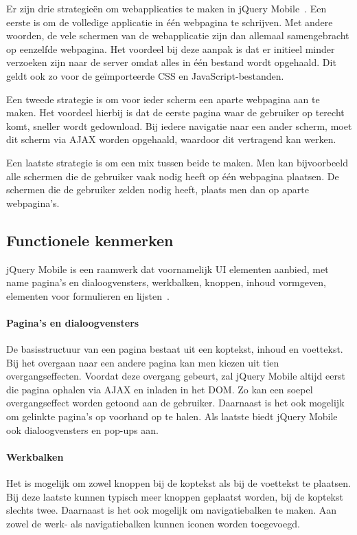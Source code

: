 Er zijn drie strategieën om webapplicaties te maken in jQuery Mobile~\cite{Broulik2012}. 
Een eerste is om de volledige applicatie in één webpagina te schrijven. Met andere woorden,  de vele schermen van de webapplicatie zijn dan allemaal samengebracht op eenzelfde webpagina. 
Het voordeel bij deze aanpak is dat er initieel minder verzoeken zijn naar de server omdat alles in één bestand wordt opgehaald. Dit geldt ook zo voor de geïmporteerde CSS en JavaScript-bestanden. 

Een tweede strategie is om voor ieder scherm een aparte webpagina aan te maken. 
Het voordeel hierbij is dat de eerste pagina waar de gebruiker op terecht komt, sneller wordt gedownload. 
Bij iedere navigatie naar een ander scherm, moet dit scherm via AJAX worden opgehaald, waardoor dit vertragend kan werken. 

Een laatste strategie is om een mix tussen beide te maken. 
Men kan bijvoorbeeld alle schermen die de gebruiker vaak nodig heeft op één webpagina plaatsen. De schermen die de gebruiker zelden nodig heeft, plaats men dan op aparte webpagina's.  

\subsection{Functionele kenmerken}
jQuery Mobile is een raamwerk dat voornamelijk UI elementen aanbied, met name pagina's en dialoogvensters, werkbalken, knoppen, inhoud vormgeven, elementen voor formulieren en lijsten~\cite{JQuery2012b}.

\paragraph{Pagina's en dialoogvensters}
De basisstructuur van een pagina bestaat uit een koptekst, inhoud en voettekst. 
Bij het overgaan naar een andere pagina kan men kiezen uit tien overgangseffecten. Voordat deze overgang gebeurt, zal jQuery Mobile altijd eerst die pagina ophalen via AJAX en inladen in het DOM. 
Zo kan een soepel overgangseffect worden getoond aan de gebruiker. 
Daarnaast is het ook mogelijk om gelinkte pagina's op voorhand op te halen. 
Als laatste biedt jQuery Mobile ook dialoogvensters en pop-ups aan. 

\paragraph{Werkbalken}
Het is mogelijk om zowel knoppen bij de koptekst als bij de voettekst te plaatsen. 
Bij deze laatste kunnen typisch meer knoppen geplaatst worden, bij de koptekst slechts twee. 
Daarnaast is het ook mogelijk om navigatiebalken te maken. 
Aan zowel de werk- als navigatiebalken kunnen iconen worden toegevoegd.

